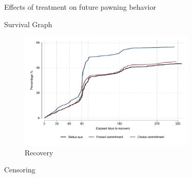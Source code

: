 \documentclass[8pt]{beamer}
\begin{document}
\begin{frame}{Effects of treatment on future pawning behavior}
    
\begin{table}[H]
\caption{Repeat Pawns}
\label{repeat_loans}
\begin{center}
\scriptsize{}
\end{center}

\end{table}    
\end{frame}



\begin{frame}{Survival Graph}
 
\begin{figure}[H]
        \caption{Recovery}
    \label{survival_graph}
    \begin{center}
        \centering
        \includegraphics[width=0.75\textwidth]{Figuras/survival_graph_unpledge.pdf}
    \end{center}
\end{figure}   
\end{frame}


\begin{frame}{Censoring}
    \begin{table}[H]
\caption{Bounding censoring}
\label{bounding_censoring}
\begin{center}
\resizebox{0.9\textwidth}{!}{
\scriptsize{}
}
\end{center}
 \scriptsize 
\end{table}
\end{frame}
\end{document}
